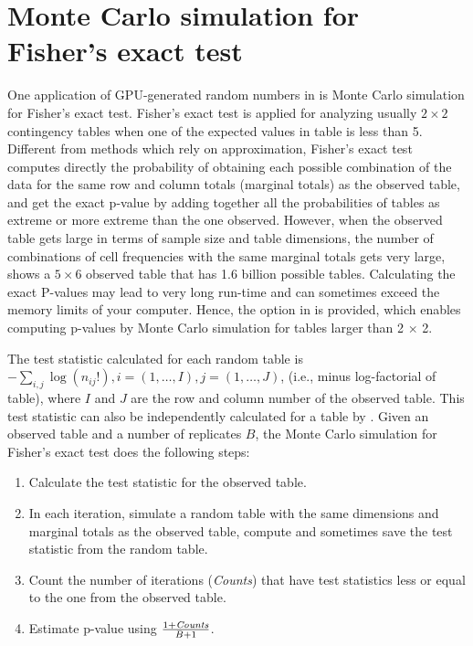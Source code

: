 \documentclass[article,nojss]{jss}\usepackage[]{graphicx}\usepackage[]{color}
\newcommand{\fct}[1]{\code{#1()}}
\begin{document}
\section{Monte Carlo simulation for Fisher's exact test}
One application of GPU-generated random numbers in  is Monte Carlo simulation for Fisher's exact test. Fisher’s exact test is applied for analyzing usually $2 \times 2$ contingency tables when one of the expected values in table is less than 5. Different from methods which rely on approximation, Fisher's exact test computes directly the probability of obtaining each possible combination of the data for the same row and column totals (marginal totals) as the observed table, and get the exact p-value by adding together all the probabilities of tables as extreme or more extreme than the one observed. However, when the observed table gets large in terms of sample size and table dimensions, the number of combinations of cell frequencies with the same marginal totals gets very large, \cite[][p. 23]{mehta2011ibm} shows a $5 \times 6$ observed table that has 1.6 billion possible tables. Calculating the exact P-values may lead to very long run-time and can sometimes exceed the memory limits of your computer. Hence, the option  in \fct{stats::fisher.test} is provided, which enables computing p-values by Monte Carlo simulation for tables larger than 2 $\times$ 2. 

The test statistic calculated for each random table is $-\sum_{i,j}\log(n_{ij}!), i=(1,\dots, I), j=(1,\dots,J)$, (i.e., minus log-factorial of table), where $I$ and $J$ are the row and column number of the observed table. This test statistic can also be independently calculated for a table by \fct{gpuRandom::logfactSum}. Given an observed table and a number of replicates $B$, the Monte Carlo simulation for Fisher's exact test does the following steps: 
\begin{enumerate}
\setlength\itemsep{-0.1em}
  \item Calculate the test statistic for the observed table.
	\item In each iteration, simulate a random table with the same dimensions and marginal totals as the observed table, compute and sometimes save the test statistic from the random table. 
	\item Count the number of iterations (\emph{Counts}) that have test statistics less or equal to the one from the observed table.
	\item Estimate p-value using $\frac{1 + \emph{Counts}}{B + 1}$.
\end{enumerate}
\end{document}
